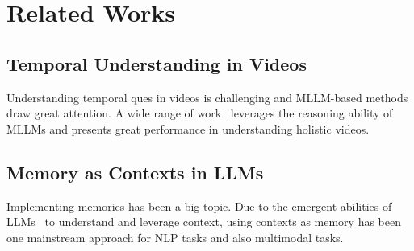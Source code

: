\section{Related Works}
\subsection{Temporal Understanding in Videos}
Understanding temporal ques in videos is challenging and MLLM-based methods draw great attention. A wide range of work~\citep{maaz-etal-2024-video, qian2025streaming,zhang2024mm,he2024ma} leverages the reasoning ability of MLLMs and presents great performance in understanding holistic videos.

\subsection{Memory as Contexts in LLMs} Implementing memories has been a big topic. Due to the emergent abilities of LLMs~\citep{Wei2022EmergentAO} to understand and leverage context, using contexts as memory has been one mainstream approach for NLP tasks\citep{fountas2024human} and also multimodal tasks\citep{fan2024videoagent,chen2024camml}.